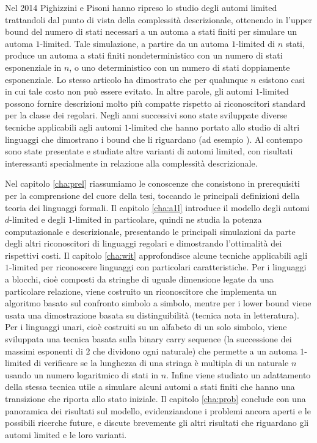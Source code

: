 Nel 2014 Pighizzini e Pisoni hanno ripreso lo studio degli automi limited trattandoli dal punto di vista della complessità descrizionale, ottenendo in \cite{Pighizzini:14:limitedRE} l'upper bound del numero di stati necessari a un automa a stati finiti per simulare un automa $1$-limited. Tale simulazione, a partire da un automa $1$-limited di $n$ stati, produce un automa a stati finiti nondeterministico con un numero di stati esponenziale in $n$, o uno deterministico con un numero di stati doppiamente esponenziale. Lo stesso articolo ha dimostrato che per qualunque $n$ esistono casi in cui tale costo non può essere evitato. In altre parole, gli automi $1$-limited possono fornire descrizioni molto più compatte rispetto ai riconoscitori standard per la classe dei regolari. Negli anni successivi sono state sviluppate diverse tecniche applicabili agli automi $1$-limited che hanno portato allo studio di altri linguaggi che dimostrano i bound che li riguardano (ad esempio \cite{Pighizzini:22:limitedwitness}). Al contempo sono state presentate e studiate altre varianti di automi limited, con risultati interessanti specialmente in relazione alla complessità descrizionale.

Nel capitolo \ref{cha:prel} riassumiamo le conoscenze che consistono in prerequisiti per la comprensione del cuore della tesi, toccando le principali definizioni della teoria dei linguaggi formali. Il capitolo \ref{cha:a1l} introduce il modello degli automi $d$-limited e degli $1$-limited in particolare, quindi ne studia la potenza computazionale e descrizionale, presentando le principali simulazioni da parte degli altri riconoscitori di linguaggi regolari e dimostrando l'ottimalità dei rispettivi costi. Il capitolo \ref{cha:wit} approfondisce alcune tecniche applicabili agli $1$-limited per riconoscere linguaggi con particolari caratteristiche. Per i linguaggi a blocchi, cioè composti da stringhe di uguale dimensione legate da una particolare relazione, viene costruito un riconoscitore che implementa un algoritmo basato sul confronto simbolo a simbolo, mentre per i lower bound viene usata una dimostrazione basata su distinguibilità (tecnica nota in letteratura). Per i linguaggi unari, cioè costruiti su un alfabeto di un solo simbolo, viene sviluppata una tecnica basata sulla binary carry sequence (la successione dei massimi esponenti di $2$ che dividono ogni naturale) che permette a un automa $1$-limited di verificare se la lunghezza di una stringa è multipla di un naturale $n$ usando un numero logaritmico di stati in $n$. Infine viene studiato un adattamento della stessa tecnica utile a simulare alcuni automi a stati finiti che hanno una transizione che riporta allo stato iniziale. Il capitolo \ref{cha:prob} conclude con una panoramica dei risultati sul modello, evidenziandone i problemi ancora aperti e le possibili ricerche future, e discute brevemente gli altri risultati che riguardano gli automi limited e le loro varianti.
